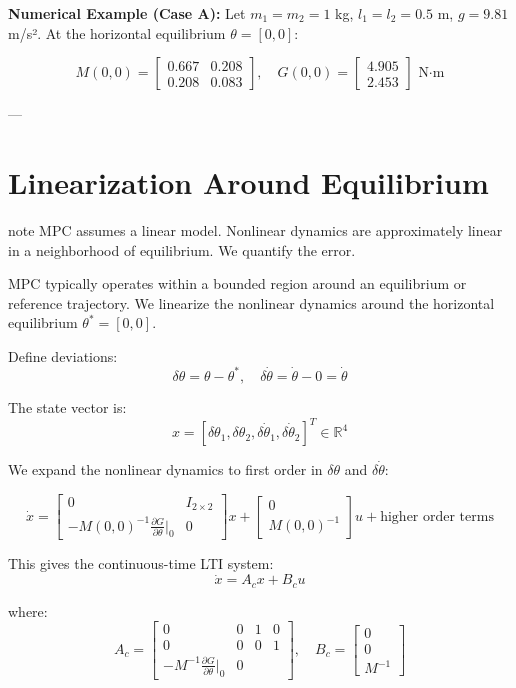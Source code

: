 \textbf{Numerical Example (Case A):} Let $m_1 = m_2 = 1$ kg, $l_1 = l_2 = 0.5$ m, $g = 9.81$ m/s². At the horizontal equilibrium $\theta = [0, 0]$:

\[
M(0, 0) = \begin{bmatrix} 0.667 & 0.208 \\ 0.208 & 0.083 \end{bmatrix}, \quad G(0, 0) = \begin{bmatrix} 4.905 \\ 2.453 \end{bmatrix} \text{ N·m}
\]

---

\section{Linearization Around Equilibrium}
\begin{block}{note}
MPC assumes a linear model. Nonlinear dynamics are approximately linear in a neighborhood of equilibrium. We quantify the error.
\end{block}

\label{sec:linearization}

MPC typically operates within a bounded region around an equilibrium or reference trajectory. We linearize the nonlinear dynamics around the horizontal equilibrium $\theta^* = [0, 0]$.

Define deviations:
\[
\delta \theta = \theta - \theta^*, \quad \delta \dot{\theta} = \dot{\theta} - 0 = \dot{\theta}
\]

The state vector is:
\[
x = [\delta \theta_1, \delta \theta_2, \delta \dot{\theta}_1, \delta \dot{\theta}_2]^T \in \mathbb{R}^4
\]

We expand the nonlinear dynamics to first order in $\delta\theta$ and $\delta\dot{\theta}$:

\[
\dot{x} = \begin{bmatrix} 0 & I_{2\times2} \\ -M(0,0)^{-1} \frac{\partial G}{\partial\theta}\big|_0 & 0 \end{bmatrix} x + \begin{bmatrix} 0 \\ M(0,0)^{-1} \end{bmatrix} u + \text{higher order terms}
\]

This gives the continuous-time LTI system:
\[
\dot{x} = A_c x + B_c u
\]

where:
\[
A_c = \begin{bmatrix}
0 & 0 & 1 & 0 \\
0 & 0 & 0 & 1 \\
-M^{-1} \frac{\partial G}{\partial\theta}\big|_0 & 0
\end{bmatrix}, \quad B_c = \begin{bmatrix} 0 \\ 0 \\ M^{-1} \end{bmatrix}
\]

